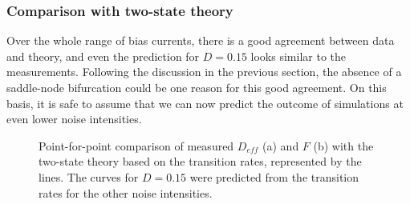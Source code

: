 \documentclass[12pt,a4paper]{article}
\begin{document}
\subsubsection{Comparison with two-state theory}
Over the whole range of bias currents, there is a good agreement between data and theory, and even the prediction for $D=0.15$ looks similar to the measurements. Following the discussion in the previous section, the absence of a saddle-node bifurcation could be one reason for this good agreement. On this basis, it is safe to assume that we can now predict the outcome of simulations at even lower noise intensities. 
\begin{figure}[H]
	\hspace*{-0.5cm}
	\caption{Point-for-point comparison of measured $D_{eff}$ (a) and $F$ (b) with the two-state theory based on the transition rates, represented by the lines. The curves for $D=0.15$ were predicted from the transition rates for the other noise intensities.}
\end{figure}
\end{document}
